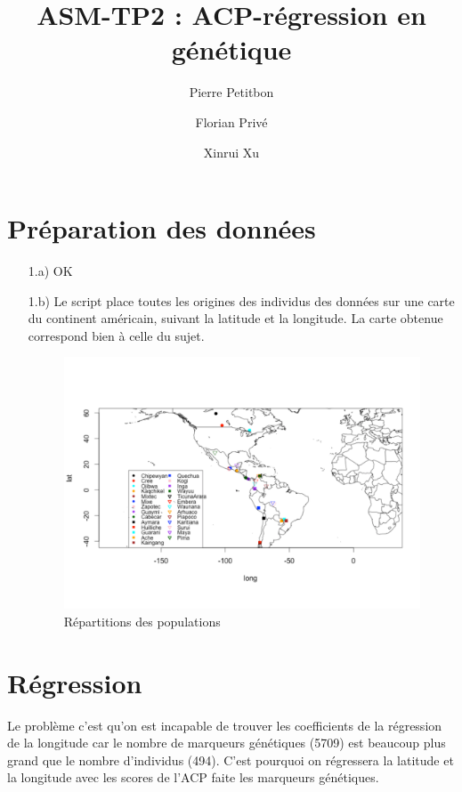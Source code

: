 \documentclass[a4paper, 12pt]{article}
\title{ASM-TP2 : ACP-régression en génétique}
\author{Pierre Petitbon \and Florian Privé \and Xinrui Xu}
\date{}
\begin{document}
\maketitle

\section{Préparation des données}

\begin{enumerate}
\setlength{\itemsep}{20pt}

\item[1.a)] 
	OK

\item[1.b)]
Le script place toutes les origines des individus des données sur une carte du continent américain, suivant la latitude et la longitude. La carte obtenue correspond bien à celle du sujet. 

\begin{figure}[!h]
\begin{center}
\includegraphics[scale=0.5]{Plot1b.pdf}
\caption{Répartitions des populations}
\end{center}
\end{figure}

\end{enumerate}


\section{Régression}
Le problème c'est qu'on est incapable de trouver les coefficients de la régression de la longitude car le nombre de marqueurs génétiques (5709) est beaucoup plus grand que le nombre d'individus (494). C'est pourquoi on régressera la latitude et la longitude avec les scores de l'ACP faite les marqueurs génétiques. 
\end{document}
